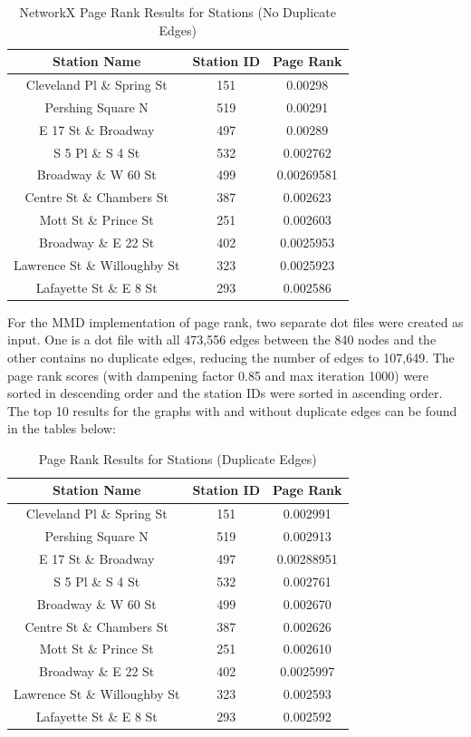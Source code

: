 \documentclass{article}
\begin{document}
 \begin{table}[h!]
\caption{NetworkX Page Rank Results for Stations (No Duplicate Edges)}
\centering
 \begin{tabular}{||c c c||} 
 \hline
Station Name & Station ID & Page Rank \\ [0.5ex] 
 \hline\hline
  Cleveland Pl \& Spring St & 151 & 0.00298\\ 
 Pershing Square N & 519 & 0.00291\\
 E 17 St \& Broadway & 497 & 0.00289\\ 
 S 5 Pl \& S 4 St & 532 & 0.002762\\
 Broadway \& W 60 St & 499 & 0.00269581\\
 Centre St \& Chambers St & 387 & 0.002623\\
 Mott St \& Prince St & 251 & 0.002603\\
 Broadway \& E 22 St & 402 & 0.0025953\\
 Lawrence St \& Willoughby St & 323 & 0.0025923\\
 Lafayette St \& E 8 St & 293 & 0.002586\\[1ex] 
 \hline
 \end{tabular}
 \end{table}
For the MMD implementation of page rank, two separate dot files were created as input. One is a dot file with all 473,556 edges between the 840 nodes and the other contains no duplicate edges, reducing the number of edges to 107,649. The page rank scores (with dampening factor 0.85 and max iteration 1000) were sorted in descending order and the station IDs were sorted in ascending order. The top 10 results for the graphs with and without duplicate edges can be found in the tables below: 
\begin{table}[h!]
\caption{Page Rank Results for Stations (Duplicate Edges)}
\centering
 \begin{tabular}{||c c c||} 
 \hline
 Station Name & Station ID & Page Rank \\ [0.5ex] 
 \hline\hline
 Cleveland Pl \& Spring St & 151 & 0.002991\\ 
 Pershing Square N & 519 & 0.002913\\
 E 17 St \& Broadway & 497 & 0.00288951\\ 
 S 5 Pl \& S 4 St & 532 & 0.002761\\
 Broadway \& W 60 St & 499 & 0.002670\\
 Centre St \& Chambers St & 387 & 0.002626\\
 Mott St \& Prince St & 251 & 0.002610\\
 Broadway \& E 22 St & 402 & 0.0025997\\
 Lawrence St \& Willoughby St & 323 & 0.002593\\
 Lafayette St \& E 8 St & 293 & 0.002592\\[1ex] 
 \hline
 \end{tabular}
 \end{table}
 
\end{document}
